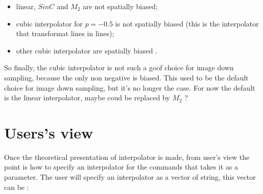 \begin{itemize}
    \item  linear, $SinC$ and   $M_2$  are not spatially biased;

    \item  cubic interpolator for $p=-0.5$ is not spatially biased (this is the interpolator that
           transformat lines in lines);

    \item  other cubic interpolator are spatially biased .
\end{itemize}

So finally, the cubic interpolator is not such a goof choice for image down sampling, 
because the only  non negative  is biased.  This used to be the default choice for
image down sampling, but it's no longer the case. For now the default is the linear
interpolator, maybe coud be replaced by $M_2$ ?



\section{Users's view}

\label{InterpUserView}

Once the theoretical presentation of interpolator is made, from user's view the point is
how to specify an interpolator for the commands that takes it as a parameter.
The user will specify an interpolator as a  vector of string, this vector can be :

